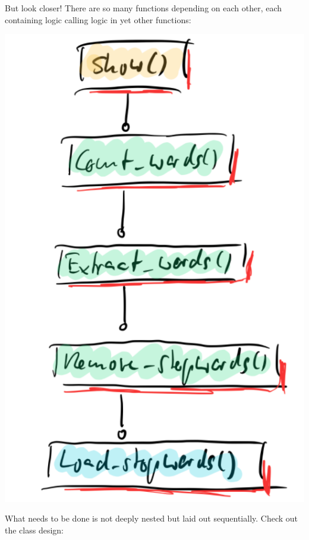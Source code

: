 \documentclass[a4paper,twoside]{article}
\numberwithin{equation}{section}
\begin{document}
But look closer! There are so many functions depending on each other, each containing logic calling logic in yet other functions:
\begin{center}
    \includegraphics[scale = 0.3]{assets/tree_layered_example.png}
\end{center}
What needs to be done is not deeply nested but laid out sequentially. Check out the class design:
\end{document}
